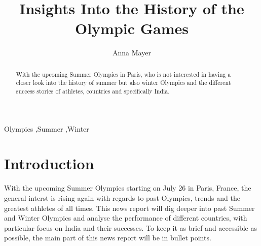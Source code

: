 \documentclass[11pt,preprint, authoryear]{elsarticle}
\numberwithin{equation}{section}
\numberwithin{figure}{section}
\numberwithin{table}{section}
\begin{document}
\begin{frontmatter}  %

\title{Insights Into the History of the Olympic Games}





\author[Add1]{Anna Mayer}





\address[Add1]{Stellenbosch Unviersity}


\begin{abstract}
\small{
With the upcoming Summer Olympics in Paris, who is not interested in
having a closer look into the history of summer but also winter Olympics
and the different success stories of athletes, countries and
specifically India.
}
\end{abstract}

\vspace{1cm}


\begin{keyword}
\footnotesize{
Olympics \sep Summer \sep Winter \\
\vspace{0.3cm}
}
\end{keyword}



\vspace{0.5cm}

\end{frontmatter}

\setcounter{footnote}{0}



\pagestyle{fancy}
\chead{}
\rhead{}
\lfoot{}
\lhead{}
\cfoot{}


\headsep 35pt %




\hypertarget{introduction}{%
\section{\texorpdfstring{Introduction
\label{Introduction}}{Introduction }}\label{introduction}}

With the upcoming Summer Olympics starting on July 26 in Paris, France,
the general interst is rising again with regards to past Olympics,
trends and the greatest athletes of all times. This news report will dig
deeper into past Summer and Winter Olympics and analyse the performance
of different countries, with particular focus on India and their
successes. To keep it as brief and accessible as possible, the main part
of this news report will be in bullet points.
\end{document}

